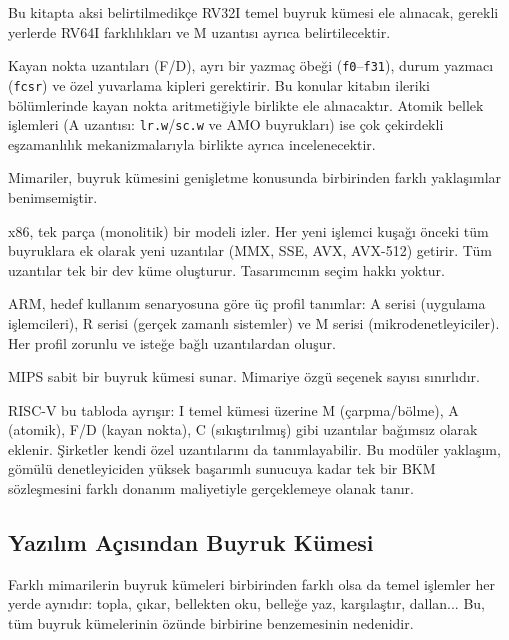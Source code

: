 Bu kitapta aksi belirtilmedikçe RV32I temel buyruk kümesi ele alınacak, gerekli yerlerde RV64I farklılıkları ve M uzantısı ayrıca belirtilecektir.

\begin{bilginot}
Kayan nokta uzantıları (F/D), ayrı bir yazmaç öbeği (\texttt{f0}--\texttt{f31}), durum yazmacı (\texttt{fcsr}) ve özel yuvarlama kipleri gerektirir. Bu konular kitabın ileriki bölümlerinde kayan nokta aritmetiğiyle birlikte ele alınacaktır. Atomik bellek işlemleri (A uzantısı: \texttt{lr.w}/\texttt{sc.w} ve AMO buyrukları) ise çok çekirdekli eşzamanlılık mekanizmalarıyla birlikte ayrıca incelenecektir.
\end{bilginot}

\begin{karsilastirma}
Mimariler, buyruk kümesini genişletme konusunda birbirinden farklı yaklaşımlar benimsemiştir.

x86, tek parça (monolitik) bir modeli izler. Her yeni işlemci kuşağı önceki tüm buyruklara ek olarak yeni uzantılar (MMX, SSE, AVX, AVX-512) getirir. Tüm uzantılar tek bir dev küme oluşturur. Tasarımcının seçim hakkı yoktur.

ARM, hedef kullanım senaryosuna göre üç profil tanımlar: A serisi (uygulama işlemcileri), R serisi (gerçek zamanlı sistemler) ve M serisi (mikrodenetleyiciler). Her profil zorunlu ve isteğe bağlı uzantılardan oluşur.

MIPS sabit bir buyruk kümesi sunar. Mimariye özgü seçenek sayısı sınırlıdır.

RISC-V bu tabloda ayrışır: I temel kümesi üzerine M (çarpma/bölme), A (atomik), F/D (kayan nokta), C (sıkıştırılmış) gibi uzantılar bağımsız olarak eklenir. Şirketler kendi özel uzantılarını da tanımlayabilir. Bu modüler yaklaşım, gömülü denetleyiciden yüksek başarımlı sunucuya kadar tek bir BKM sözleşmesini farklı donanım maliyetiyle gerçeklemeye olanak tanır.
\end{karsilastirma}


\subsection{Yazılım Açısından Buyruk Kümesi}

Farklı mimarilerin buyruk kümeleri birbirinden farklı olsa da temel işlemler her yerde aynıdır: topla, çıkar, bellekten oku, belleğe yaz, karşılaştır, dallan... Bu, tüm buyruk kümelerinin özünde birbirine benzemesinin nedenidir.

